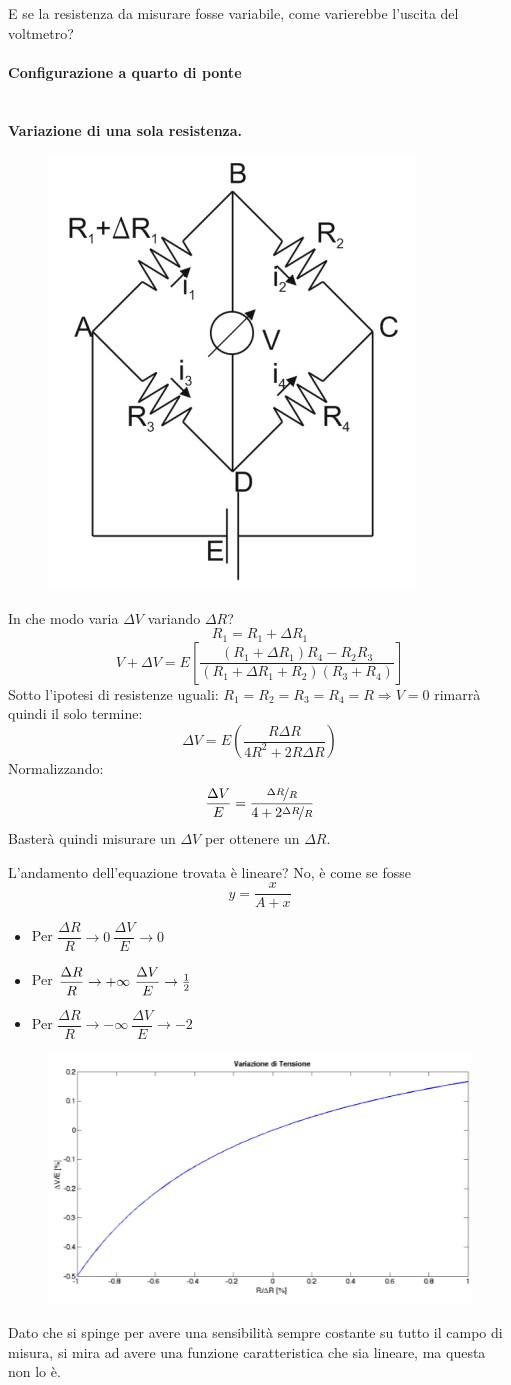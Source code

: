 \documentclass[a4paper, 15pt]{article}
\begin{document}
\begin{adjustwidth}{2in}{}
		E se la resistenza da misurare fosse variabile, come varierebbe l'uscita del voltmetro? 
		
\paragraph{Configurazione a quarto di ponte} \mbox{} \\		
		\textbf{Variazione di una sola resistenza.}		
		\begin{figure}[H]
			\centering
			\includegraphics[width=0.3\linewidth]{fig/screenshot013}
			\label{fig:screenshot013}
		\end{figure}				
		In che modo varia $\Delta V$ variando $\Delta R$?
		\[R_1 = R_1 + \Delta R_1\]
		\[V+\Delta V = E\left[\dfrac{(R_1+ \Delta R_1)R_4-R_2R_3}{(R_1+ \Delta R_1+R_2)(R_3+R_4)}\right]\]
		Sotto l'ipotesi di resistenze uguali: $R_1=R_2=R_3=R_4=R\Rightarrow V=0$ rimarrà quindi il solo termine:
		\[\Delta V = E\left(\dfrac{R\Delta R}{4R^2 + 2R\Delta R}\right)\]
		Normalizzando: 
		\[\dfrac{\Delta V}{E} = \dfrac{\nicefrac{\Delta R}{R}}{4+2\nicefrac{\Delta R}{R}}\]
		Basterà quindi misurare un $\Delta V$ per ottenere un $\Delta R$. \newline 
		
		L'andamento dell'equazione trovata è lineare? No, è come se fosse 
		 \[y = \dfrac{x}{A+x}\]		
		\begin{itemize}
		\item Per \(\dfrac{\Delta R}{R}\rightarrow0 ~ \dfrac{\Delta V}{E} \rightarrow 0\)
		
		\item Per \(\dfrac{\Delta R}{R}\rightarrow+\infty ~ \dfrac{\Delta V}{E} \rightarrow {1\over2}\) 
		
		\item Per \(\dfrac{\Delta R}{R}\rightarrow-\infty ~ \dfrac{\Delta V}{E} \rightarrow -2\)	
		\end{itemize}	
		\begin{figure}[H]
			\centering
			\includegraphics[width=0.5\linewidth]{fig/screenshot014}
			\label{fig:screenshot014}
		\end{figure}		
		Dato che si spinge per avere una sensibilità sempre costante su tutto il campo di misura, si mira ad avere una funzione caratteristica che sia lineare, ma questa non lo è.
		

\end{adjustwidth}
\end{document}
